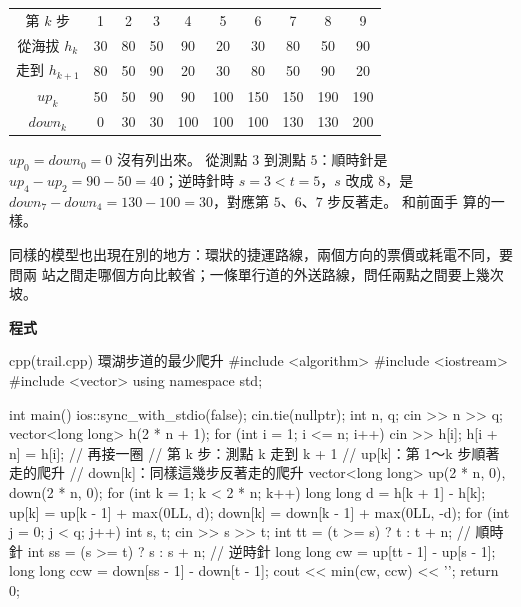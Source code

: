 \begin{center}
\begin{tabular}{c|ccccccccc}
\toprule
第 $k$ 步 & 1 & 2 & 3 & 4 & 5 & 6 & 7 & 8 & 9 \\
從海拔 $h_k$ & 30 & 80 & 50 & 90 & 20 & 30 & 80 & 50 & 90 \\
走到 $h_{k+1}$ & 80 & 50 & 90 & 20 & 30 & 80 & 50 & 90 & 20 \\
\midrule
$up_k$ & 50 & 50 & 90 & 90 & 100 & 150 & 150 & 190 & 190 \\
$down_k$ & 0 & 30 & 30 & 100 & 100 & 100 & 130 & 130 & 200 \\
\bottomrule
\end{tabular}
\end{center}

$up_0 = down_0 = 0$ 沒有列出來。 從測點 $3$ 到測點 $5$：順時針是
$up_4 - up_2 = 90 - 50 = 40$；逆時針時 $s = 3 < t = 5$，$s$ 改成 $8$，是
$down_7 - down_4 = 130 - 100 = 30$，對應第 $5$、$6$、$7$ 步反著走。 和前面手
算的一樣。

同樣的模型也出現在別的地方：環狀的捷運路線，兩個方向的票價或耗電不同，要問兩
站之間走哪個方向比較省；一條單行道的外送路線，問任兩點之間要上幾次坡。

\textbf{程式}

\begin{example}[label=ex:ps-trail]{cpp}{(trail.cpp) 環湖步道的最少爬升}
#include <algorithm>
#include <iostream>
#include <vector>
using namespace std;

int main() {
    ios::sync_with_stdio(false);
    cin.tie(nullptr);
    int n, q;
    cin >> n >> q;
    vector<long long> h(2 * n + 1);
    for (int i = 1; i <= n; i++) {
        cin >> h[i];
        h[i + n] = h[i];          // 再接一圈
    }
    // 第 k 步：測點 k 走到 k + 1
    // up[k]：第 1～k 步順著走的爬升
    // down[k]：同樣這幾步反著走的爬升
    vector<long long> up(2 * n, 0), down(2 * n, 0);
    for (int k = 1; k < 2 * n; k++) {
        long long d = h[k + 1] - h[k];
        up[k] = up[k - 1] + max(0LL, d);
        down[k] = down[k - 1] + max(0LL, -d);
    }
    for (int j = 0; j < q; j++) {
        int s, t;
        cin >> s >> t;
        int tt = (t >= s) ? t : t + n;  // 順時針
        int ss = (s >= t) ? s : s + n;  // 逆時針
        long long cw = up[tt - 1] - up[s - 1];
        long long ccw = down[ss - 1] - down[t - 1];
        cout << min(cw, ccw) << '\n';
    }
    return 0;
}
\end{example}


